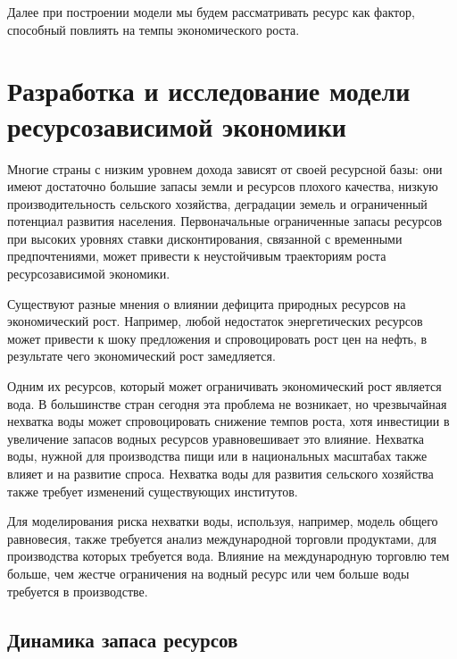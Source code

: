 \documentclass[12pt,a4paper, oneside]{extreport}
\begin{document}
Далее при построении модели мы будем рассматривать  ресурс как  фактор, способный повлиять на темпы  экономического роста.




\chapter{Разработка и исследование модели ресурсозависимой экономики}


Многие страны с низким уровнем дохода  зависят  от своей ресурсной базы:  они  имеют достаточно  большие запасы земли и ресурсов  плохого качества,  низкую  производительность  сельского хозяйства, деградации земель и ограниченный потенциал развития населения.   
Первоначальные  ограниченные   запасы ресурсов  при высоких уровнях  ставки дисконтирования, связанной  с временными предпочтениями, может привести к неустойчивым траекториям роста ресурсозависимой экономики. 



Существуют разные мнения о  влиянии дефицита природных  ресурсов на экономический  рост. Например, любой недостаток энергетических ресурсов может привести к  шоку предложения и спровоцировать рост цен на нефть, в  результате чего  экономический рост замедляется. 



Одним их ресурсов, который может ограничивать экономический  рост является вода. В большинстве стран сегодня эта проблема не возникает,   но чрезвычайная нехватка воды может спровоцировать  снижение темпов   роста, хотя инвестиции  в увеличение запасов водных ресурсов уравновешивает это влияние. 
Нехватка  воды, нужной  для производства пищи  или  в  национальных масштабах также влияет и на  развитие спроса. 
Нехватка воды для развития сельского хозяйства также требует изменений существующих  институтов.


Для моделирования риска нехватки  воды,   используя, например,  модель общего равновесия,  также  требуется  анализ международной торговли  продуктами,  для производства которых требуется вода. 
Влияние на международную торговлю тем больше, чем жестче   ограничения на водный ресурс или чем больше  воды требуется  в производстве.







\section{Динамика запаса ресурсов}
\end{document}
